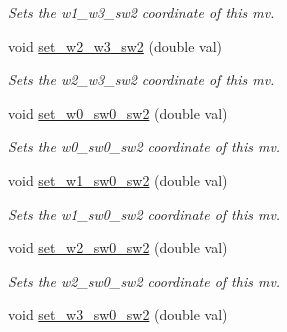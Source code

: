 \begin{DoxyCompactItemize}
\begin{DoxyCompactList}\small\item\em Sets the w1\-\_\-w3\-\_\-sw2 coordinate of this mv. \end{DoxyCompactList}\item 
\hypertarget{classe3ga_1_1mv_af59b6ddfcc1a1d923d068206f195bf6e}{void \hyperlink{classe3ga_1_1mv_af59b6ddfcc1a1d923d068206f195bf6e}{set\-\_\-w2\-\_\-w3\-\_\-sw2} (double val)}\label{classe3ga_1_1mv_af59b6ddfcc1a1d923d068206f195bf6e}

\begin{DoxyCompactList}\small\item\em Sets the w2\-\_\-w3\-\_\-sw2 coordinate of this mv. \end{DoxyCompactList}\item 
\hypertarget{classe3ga_1_1mv_aff047cba8dd2793664d4f6ce02975c81}{void \hyperlink{classe3ga_1_1mv_aff047cba8dd2793664d4f6ce02975c81}{set\-\_\-w0\-\_\-sw0\-\_\-sw2} (double val)}\label{classe3ga_1_1mv_aff047cba8dd2793664d4f6ce02975c81}

\begin{DoxyCompactList}\small\item\em Sets the w0\-\_\-sw0\-\_\-sw2 coordinate of this mv. \end{DoxyCompactList}\item 
\hypertarget{classe3ga_1_1mv_afeef00d8ab80d41f9c6182fbcbf311e9}{void \hyperlink{classe3ga_1_1mv_afeef00d8ab80d41f9c6182fbcbf311e9}{set\-\_\-w1\-\_\-sw0\-\_\-sw2} (double val)}\label{classe3ga_1_1mv_afeef00d8ab80d41f9c6182fbcbf311e9}

\begin{DoxyCompactList}\small\item\em Sets the w1\-\_\-sw0\-\_\-sw2 coordinate of this mv. \end{DoxyCompactList}\item 
\hypertarget{classe3ga_1_1mv_ae783df9cfc79822a700c96b062887a1e}{void \hyperlink{classe3ga_1_1mv_ae783df9cfc79822a700c96b062887a1e}{set\-\_\-w2\-\_\-sw0\-\_\-sw2} (double val)}\label{classe3ga_1_1mv_ae783df9cfc79822a700c96b062887a1e}

\begin{DoxyCompactList}\small\item\em Sets the w2\-\_\-sw0\-\_\-sw2 coordinate of this mv. \end{DoxyCompactList}\item 
\hypertarget{classe3ga_1_1mv_a63db78ca81f70aed49f57b83166b94c5}{void \hyperlink{classe3ga_1_1mv_a63db78ca81f70aed49f57b83166b94c5}{set\-\_\-w3\-\_\-sw0\-\_\-sw2} (double val)}\label{classe3ga_1_1mv_a63db78ca81f70aed49f57b83166b94c5}


\end{DoxyCompactItemize}
